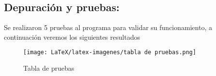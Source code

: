    
\subsection{\textbf{Depuración y pruebas:}}
Se realizaron 5 pruebas al programa para validar su funcionamiento, a continuación veremos los siguientes resultados 



   \begin{figure}[H]
    \centering
    \texttt{[image: LaTeX/latex-imagenes/tabla de pruebas.png]}
    \caption{Tabla de pruebas}
    \label{fig:Grafica de la distancia de dos puntos }
\end{figure}